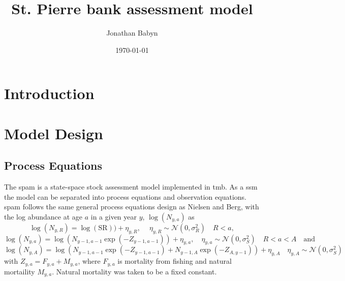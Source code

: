 \documentclass[11pt]{article}\usepackage[]{graphicx}\usepackage[]{color}
\begin{document}
\title{St. Pierre bank assessment model}
\author{Jonathan Babyn}
\date{\today}
\maketitle

\tableofcontents
\newpage

\printnomenclature

\section{Introduction}

\section{Model Design}
\subsection{Process Equations}
The \acrfull{spam} is a state-space stock assessment model implemented in \acrfull{tmb}. As a \acrfull{ssm} the model can be separated into process equations and observation equations. \acrshort{spam} follows the same general process equations design as Nielsen and Berg\cite{Nielsen2014Estimation-of-t}, with the log abundance at age $a$ in a given year $y$, $\log(N_{y,a})$ as 
\begin{equation}\label{Nrec}
\log(N_{y,R}) = \log(\text{SR})) + \eta_{y,R}, \quad \ \eta_{y,R} \sim \mathcal{N}(0,\sigma_R^2) \quad R < a ,
\end{equation}
\begin{equation}\label{Nsur}
\log(N_{y,a}) = \log(N_{y-1,a-1}\exp(-Z_{y-1,a-1})) + \eta_{y,a}, \quad \eta_{y,a} \sim \mathcal{N}(0,\sigma_S^2) \quad R < a < A \quad \text{and}
\end{equation}
\begin{equation}\label{Nplus}
\log(N_{y,A}) = \log(N_{y-1,a-1}\exp(-Z_{y-1,a-1})+N_{y-1,A}\exp(-Z_{A,y-1})) + \eta_{y,A} \quad \eta_{y,A} \sim \mathcal{N}(0,\sigma^2_S)
\end{equation}
with $Z_{y,a} = F_{y,a} + M_{y,a}$, where $F_{y,a}$ is mortality from fishing and natural mortaility $M_{y,a}$. Natural mortality was taken to be a fixed constant.
\end{document}
